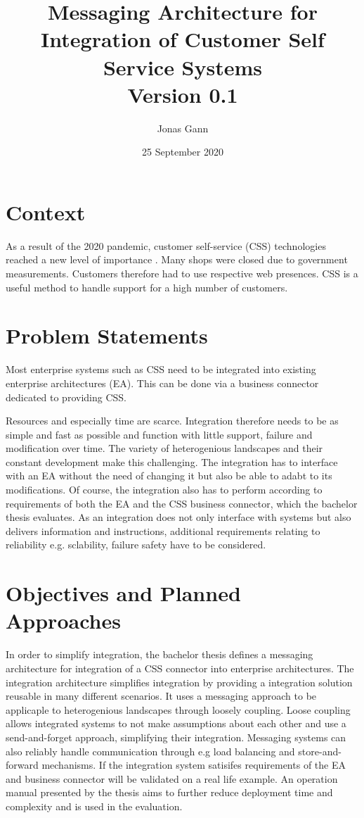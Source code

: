 \documentclass{article}
\title{Messaging Architecture for Integration of Customer Self Service Systems \\ Version 0.1}
\author{Jonas Gann}
\date{25 September 2020}
\begin{document}
\maketitle

\section{Context}

As a result of the 2020 pandemic, customer self-service (CSS) technologies reached a new level of importance \cite{covid}.
Many shops were closed due to government measurements. Customers therefore had to use respective web
presences. CSS is a useful method to handle support for a high number of customers.

\section{Problem Statements}

Most enterprise systems such as CSS need to be integrated into existing enterprise architectures (EA).
This can be done via a business connector dedicated to providing CSS. 

Resources and especially time are scarce. Integration therefore needs to be as simple and fast as possible and 
function with little support, failure and modification over time. The variety of heterogenious landscapes and their constant 
development make this challenging. The integration has to interface with an EA without the need of changing it but also be able to 
adabt to its modifications.
Of course, the integration also has to perform according to requirements of both the EA and the CSS business connector, which 
the bachelor thesis evaluates.
As an integration does not only interface with systems but also delivers information and instructions, additional requirements 
relating to reliability e.g. sclability, failure safety have to be considered.

\section{Objectives and Planned Approaches}

In order to simplify integration, the bachelor thesis defines a messaging architecture for integration of a CSS connector 
into enterprise
architectures. The integration architecture simplifies integration by providing a integration solution reusable in many different 
scenarios. It uses a messaging approach to be applicaple to heterogenious landscapes through loosely coupling. 
Loose coupling allows integrated systems to not make assumptions about each other and use a send-and-forget approach, 
simplifying their integration.
Messaging systems can also reliably handle communication through e.g load balancing and store-and-forward mechanisms.
If the integration system satisifes requirements of the EA and business connector will be validated on a real life example.
An operation manual presented by the thesis aims to further reduce deployment time and complexity and is used in the evaluation.
\end{document}
